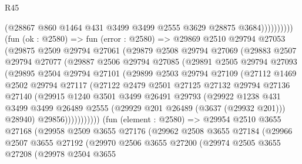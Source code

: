 \begin{lexlean}{R45}
\begin{coremodule}
                          (@28867 @860 @1464 @431 @3499 @3499 @2555 @3629 @28875 @3684))))))))))
        (fun (ok : @2580) =>
        fun (error : @2580) =>
        @29869
          @2510
          @29794
          @27053
          (@29875
            @2509
            @29794
            @27061
            (@29879
              @2508
              @29794
              @27069
              (@29883
                @2507
                @29794
                @27077
                (@29887
                  @2506
                  @29794
                  @27085
                  (@29891
                    @2505
                    @29794
                    @27093
                    (@29895
                      @2504
                      @29794
                      @27101
                      (@29899
                        @2503
                        @29794
                        @27109
                        (@27112
                          @1469
                          @2502
                          @29794
                          @27117
                          (@27122
                            @2479
                            @2501
                            @27125
                            @27132
                            @29794
                            @27136
                            @27140
                            (@29915
                              @1240
                              @3501
                              @3499
                              @26491
                              @29793
                              (@29922
                                @1238
                                @431
                                @3499
                                @3499
                                @26489
                                @2555
                                (@29929 @201 @26489 (@3637 (@29932 @201)))
                                @28940)
                              @29856)))))))))))
        (fun (element : @2580) =>
        @29954
          @2510
          @3655
          @27168
          (@29958
            @2509
            @3655
            @27176
            (@29962
              @2508
              @3655
              @27184
              (@29966
                @2507
                @3655
                @27192
                (@29970
                  @2506
                  @3655
                  @27200
                  (@29974
                    @2505
                    @3655
                    @27208
                    (@29978
                      @2504
                      @3655

\end{coremodule}
\end{lexlean}
